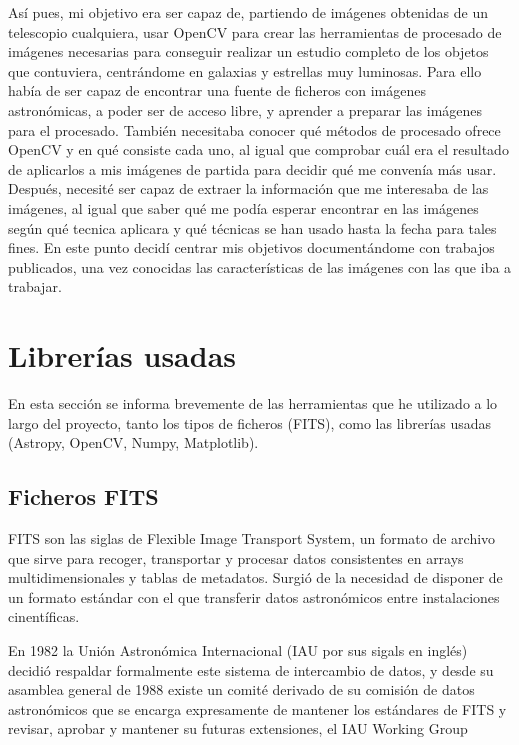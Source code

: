\documentclass[a4paper,12pt]{article}
\begin{document}
Así pues, mi objetivo era ser capaz de, partiendo de imágenes obtenidas de un telescopio cualquiera, usar OpenCV para crear las herramientas de procesado de imágenes necesarias para conseguir realizar un estudio completo de los objetos que contuviera, centrándome en galaxias y estrellas muy luminosas. Para ello había de ser capaz de encontrar una fuente de ficheros con imágenes astronómicas, a poder ser de acceso libre, y aprender a preparar las imágenes para el procesado. También necesitaba conocer qué métodos de procesado ofrece OpenCV y en qué consiste cada uno, al igual que comprobar cuál era el resultado de aplicarlos a mis imágenes de partida para decidir qué me convenía más usar. Después, necesité ser capaz de extraer la información que me interesaba de las imágenes, al igual que saber qué me podía esperar encontrar en las imágenes según qué tecnica aplicara y qué técnicas se han usado hasta la fecha para tales fines. En este punto decidí centrar mis objetivos documentándome con trabajos publicados\cite{jbraz,liu, luc, devendra, achgill}, una vez conocidas las características de las imágenes con las que iba a trabajar\cite{path, telescopes}.
\section{Librerías usadas}

En esta sección se informa brevemente de las herramientas que he utilizado a lo largo del proyecto, tanto los tipos de ficheros (FITS), como las librerías usadas (Astropy, OpenCV, Numpy, Matplotlib).
\subsection{Ficheros FITS}
\label{sec:FITS}

FITS\cite{fits} son las siglas de Flexible Image Transport System, un formato de archivo que sirve para recoger, transportar y procesar datos consistentes en arrays multidimensionales y tablas de metadatos. Surgió de la necesidad de disponer de un formato estándar con el que transferir datos astronómicos entre instalaciones cinentíficas.

En 1982 la Unión Astronómica Internacional (IAU por sus sigals en inglés) decidió respaldar formalmente este sistema de intercambio de datos, y desde su asamblea general de 1988 existe un comité derivado de su comisión de datos astronómicos que se encarga expresamente de mantener los estándares de FITS y revisar, aprobar y mantener su futuras extensiones, el IAU Working Group 
\end{document}
